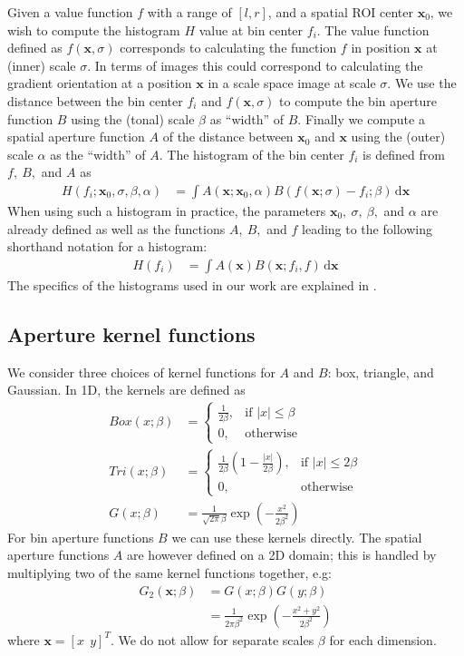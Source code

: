 \documentclass[thesis.tex]{subfiles}
\def\x{\mathbf{x}}
\begin{document}
Given a value function $f$ with a range of $[l,r]$, and a spatial ROI center $\x_0$, we wish to compute the histogram $H$ value at bin center $f_i$.
The value function defined as $f(\x,\sigma)$ corresponds to calculating the function $f$ in position $\x$ at (inner) scale $\sigma$. In terms of images this could correspond to calculating the gradient orientation at a position $\x$ in a scale space image at scale $\sigma$.
We use the distance between the bin center $f_i$ and $f(\x,\sigma)$ to compute the bin aperture function $B$ using the (tonal) scale $\beta$ as ``width'' of $B$. Finally we compute a spatial aperture function $A$ of the distance between $\x_0$ and $\x$ using the (outer) scale $\alpha$ as the ``width'' of $A$. The histogram of the bin center $f_i$ is defined from $f,~B,$ and $A$ as
%
\begin{align}
	\label{eq:histogramLong}
	H(f_i;\x_0,\sigma,\beta,\alpha) &= \int A(\x;\x_0,\alpha) B(f(\x;\sigma)-f_i;\beta)\,\text{d}\x
\end{align}
%
When using such a histogram in practice, the parameters $\x_0,~\sigma,~\beta,$ and $\alpha$ are already defined as well as the functions $A,~B,$ and $f$ leading to the following shorthand notation for a histogram:
%
\begin{align}
	\label{eq:histogramShort}
	H(f_i) &= \int A(\x) B(\x;f_i,f)\,\text{d}\x
\end{align}
%
The specifics of the histograms used in our work are explained in .
%
\subsection{Aperture kernel functions}
%
We consider three choices of kernel functions for $A$ and $B$: box, triangle, and Gaussian. In 1D, the kernels are defined as
%
\begin{align*}
\mathit{Box} (x; \beta) &= 
\begin{cases}
    \frac{1}{2 \beta},& \text{if } |x| \leq \beta \\
    0,              & \text{otherwise}
\end{cases} \\
\mathit{Tri} (x; \beta) &= 
\begin{cases}
    \frac{1}{2 \beta} \left( 1 - \frac{| x |}{2 \beta} \right) ,& \text{if } |x| \leq 2 \beta \\
    0,              & \text{otherwise}
\end{cases} \\
G(x;\beta) &= \frac{1}{\sqrt{2\pi} \beta}
\exp\left( -\frac{x^2}{2 \beta^2} \right)
\end{align*}
%
For bin aperture functions $B$ we can use these kernels directly. The spatial aperture functions $A$ are however defined on a 2D domain; this is handled by multiplying two of the same kernel functions together, e.g:
%
\begin{align*}
G_2(\x;\beta) &= G(x;\beta) G(y;\beta) \\
&= \frac{1}{2\pi \beta^2}
\exp\left( -\frac{x^2 + y^2}{2 \beta^2} \right)
\end{align*}
%
where $\x = [x ~~ y]^T$. We do not allow for separate scales $\beta$ for each dimension.
%
\end{document}
